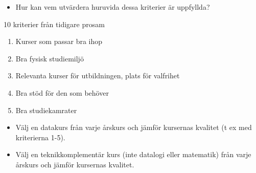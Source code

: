 \begin{frame}
  \begin{question}
    \begin{itemize}
      \item Hur kan vem utvärdera huruvida dessa kriterier är uppfyllda?
    \end{itemize}
  \end{question}

  \begin{block}{10 kriterier från tidigare prosam}
    \begin{enumerate}\resumeenumi
      \item Kurser som passar bra ihop
      \item Bra fysisk studiemiljö
      \item Relevanta kurser för utbildningen, plats för valfrihet
      \item Bra stöd för den som behöver
      \item Bra studiekamrater
    \end{enumerate}
  \end{block}
\end{frame}


\begin{frame}
  \begin{exercise}
    \begin{itemize}
      \item Välj en datakurs från varje årskurs och jämför kursernas kvalitet 
        (t ex med kriterierna 1-5).
    \end{itemize}
  \end{exercise}
\end{frame}


\begin{frame}
  \begin{exercise}
    \begin{itemize}
      \item Välj en teknikkomplementär kurs (inte datalogi eller matematik) 
        från varje årskurs och jämför kursernas kvalitet.
    \end{itemize}
  \end{exercise}
\end{frame}

